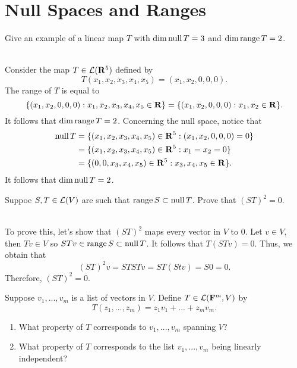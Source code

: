 \section{Null Spaces and Ranges}

\begin{exercise}
    Give an example of a linear map $T$ with $\dim \operatorname{\text{null}} T = 3$ and $\dim \operatorname{\text{range}} T = 2$. \\
\end{exercise}

\begin{solution}
    \\ Consider the map $T \in \mathcal{L}(\mathbf{R}^5)$ defined by
    $$T(x_1, x_2, x_3, x_4, x_5) = (x_1, x_2, 0, 0, 0).$$ 
    The range of $T$ is equal to
    $$\{(x_1, x_2, 0, 0, 0) : x_1, x_2, x_3, x_4, x_5 \in \mathbf{R}\} = \{(x_1, x_2, 0, 0, 0) : x_1, x_2 \in \mathbf{R}\}.$$ 
    It follows that $\dim \operatorname{\text{range}} T = 2$. Concerning the null space, notice that
    \begin{align*}
        \operatorname{\text{null}} T &= \{(x_1, x_2, x_3, x_4, x_5)\in \mathbf{R}^5 : (x_1, x_2, 0, 0, 0) = 0\} \\
        &= \{(x_1, x_2, x_3, x_4, x_5)\in \mathbf{R}^5 : x_1 = x_2 = 0\} \\
        &= \{(0,0, x_3, x_4, x_5)\in \mathbf{R}^5 : x_3, x_4, x_5 \in \mathbf{R}\}.
    \end{align*}
    It follows that $\dim \operatorname{\text{null}} T = 2$. \\
\end{solution}

\begin{exercise}
    Suppoe $S,T \in \mathcal{L}(V)$ are such that $\operatorname{\text{range}} S \subset \operatorname{\text{null}} T$. Prove that $(ST)^2 = 0$. \\
\end{exercise}

\begin{solution}
    \\ To prove this, let's show that $(ST)^2$ maps every vector in $V$ to 0. Let $v \in V$, then $Tv \in V$ so $STv \in \operatorname{\text{range}} S \subset \operatorname{\text{null}} T$. It follows that $T(STv) = 0$. Thus, we obtain that 
    $$(ST)^2v = STSTv = ST(Stv) = S0 = 0.$$
    Therefore, $(ST)^2 = 0$. \\
\end{solution}

\begin{exercise}
    Suppose $v_1, ..., v_m$ is a list of vectors in $V$. Define $T \in \mathcal{L}(\mathbf{F}^m, V)$ by
    $$T(z_1, ..., z_m) = z_1v_1 + ... + z_mv_m.$$
    \begin{enumerate}[label=(\alph*)]
        \item What property of $T$ corresponds to $v_1, ..., v_m$ spanning $V$?
        \item What property of $T$ corresponds to the list $v_1, ..., v_m$ being linearly independent?\\
    \end{enumerate}
\end{exercise}

